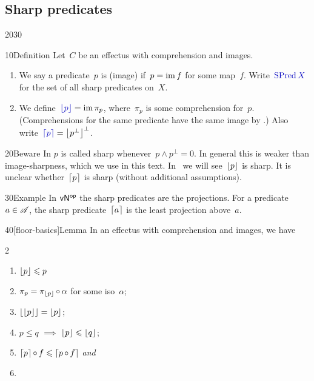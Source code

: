 \subsection{Sharp predicates}
\begin{parsec}{2030}%
\begin{point}{10}{Definition}%
Let~$C$ be an effectus with comprehension and images.
\begin{enumerate}
\item
    We say a predicate~$p$ is (image)  
        if~$p = \operatorname{im} f$ for some map~$f$.
        Write~$\Define{\SPred X}$ for the set of all sharp predicates on~$X$.
\item
    We define~$\Define{\floor{p}} = \IM \pi_p$, 
    where~$\pi_p$ is some comprehension for~$p$.
(Comprehensions for the same predicate have the same image
    by .)
Also write~$\Define{\ceil{p}} = \floor{p^\perp}^\perp$.
\end{enumerate}
\begin{point}{20}{Beware}%
In \cite{effintro} $p$ is called sharp whenever~$p \wedge p^\perp=0$.
In general this is weaker than image-sharpness, which we use in this text.
In~
    we will see~$\left\lfloor p\right\rfloor$ is sharp.
It is unclear whether~$\left\lceil p\right\rceil$ is sharp (without additional
    assumptions).
\end{point}
\end{point}
\begin{point}{30}{Example}%
In ${\mathsf{vN}}{^{\mathsf{op}}}$ the sharp predicates are the projections.
For a predicate~$a \in \mathscr{A}$,
    the sharp predicate~$\left\lceil a\right\rceil$
    is the least projection above~$a$.
\end{point}
\begin{point}{40}[floor-basics]{Lemma}%
In an effectus with comprehension and images, we have
\begin{multicols}{2}
\begin{enumerate}
\item
    $\left\lfloor p\right\rfloor \leqslant p$
\item
    $\pi_p = \pi_{\left\lfloor p\right\rfloor} \mathop{\circ} \alpha$
        for some iso~$\alpha$;
\item
    $\left\lfloor\left\lfloor p\right\rfloor\right\rfloor = \left\lfloor p\right\rfloor$;
\item
    $p \leq q$ $\implies$ $\left\lfloor p\right\rfloor \leqslant \left\lfloor q\right\rfloor$;
\item
    $\left\lceil p\right\rceil \mathop{\circ} f \leqslant \left\lceil p \mathop{\circ} f\right\rceil$ \emph{and}
\item

\end{enumerate}
\end{multicols}
\end{point}
\end{parsec}
